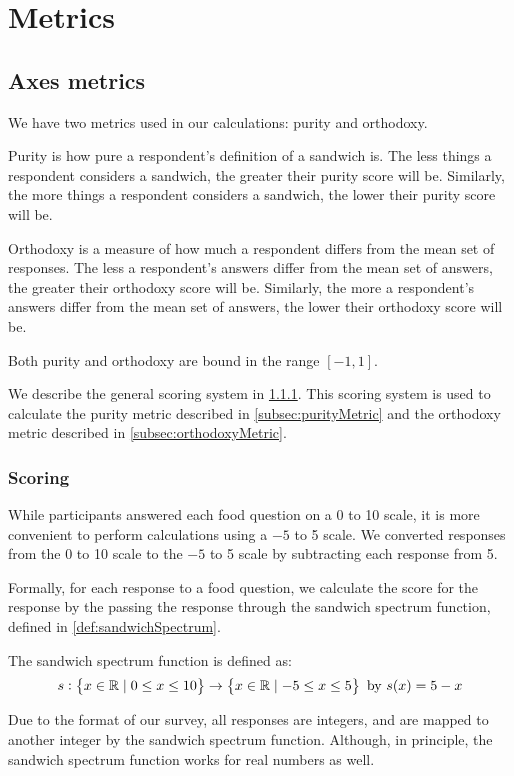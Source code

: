 \chapter{Metrics}

\section{Axes metrics}
We have two metrics used in our calculations: purity and orthodoxy.

Purity is how pure a respondent's definition of a sandwich is.
The less things a respondent considers a sandwich, the greater their purity score will be.
Similarly, the more things a respondent considers a sandwich, the lower their purity score will be.

Orthodoxy is a measure of how much a respondent differs from the mean set of responses.
The less a respondent's answers differ from the mean set of answers, the greater their orthodoxy score will be.
Similarly, the more a respondent's answers differ from the mean set of answers, the lower their orthodoxy score will be.

Both purity and orthodoxy are bound in the range $[-1, 1]$.

We describe the general scoring system in \cref{subsec:scoring}.
This scoring system is used to calculate the purity metric described in \cref{subsec:purityMetric} and the orthodoxy metric described in \cref{subsec:orthodoxyMetric}.

\subsection{Scoring}\label{subsec:scoring}
While participants answered each food question on a 0 to 10 scale, it is more convenient to perform calculations using a $-5$ to 5 scale.
We converted responses from the 0 to 10 scale to the $-5$ to 5 scale by subtracting each response from 5.

Formally, for each response to a food question, we calculate the score for the response by the passing the response through the sandwich spectrum function, defined in \cref{def:sandwichSpectrum}.

\begin{definition}\label{def:sandwichSpectrum}
	The sandwich spectrum function is defined as:
	\begin{equation}
		s : \set{x \in \mathbb{R}\mid0 \leq x \leq 10} \to \set{x \in \mathbb{R}\mid-5 \leq x \leq 5}\ \text{by}\ s(x) = 5 - x
	\end{equation}
\end{definition}
Due to the format of our survey, all responses are integers, and are mapped to another integer by the sandwich spectrum function.
Although, in principle, the sandwich spectrum function works for real numbers as well.


